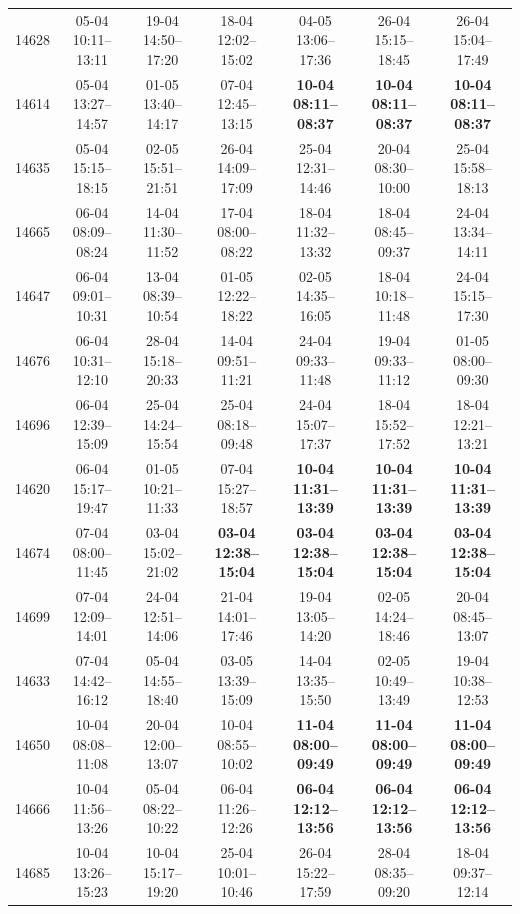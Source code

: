 \begin{table}[htbp]
\begin{tabular}{|r|c|c|c|c|c|c|}
14628 & 05-04 10:11--13:11 & 19-04 14:50--17:20 & 18-04 12:02--15:02 & 04-05 13:06--17:36 & 26-04 15:15--18:45 & 26-04 15:04--17:49 \\ 
14614 & 05-04 13:27--14:57 & 01-05 13:40--14:17 & 07-04 12:45--13:15 & \textbf{10-04 08:11--08:37} & \textbf{10-04 08:11--08:37} & \textbf{10-04 08:11--08:37} \\ 
14635 & 05-04 15:15--18:15 & 02-05 15:51--21:51 & 26-04 14:09--17:09 & 25-04 12:31--14:46 & 20-04 08:30--10:00 & 25-04 15:58--18:13 \\ 
14665 & 06-04 08:09--08:24 & 14-04 11:30--11:52 & 17-04 08:00--08:22 & 18-04 11:32--13:32 & 18-04 08:45--09:37 & 24-04 13:34--14:11 \\ 
14647 & 06-04 09:01--10:31 & 13-04 08:39--10:54 & 01-05 12:22--18:22 & 02-05 14:35--16:05 & 18-04 10:18--11:48 & 24-04 15:15--17:30 \\ 
14676 & 06-04 10:31--12:10 & 28-04 15:18--20:33 & 14-04 09:51--11:21 & 24-04 09:33--11:48 & 19-04 09:33--11:12 & 01-05 08:00--09:30 \\ 
14696 & 06-04 12:39--15:09 & 25-04 14:24--15:54 & 25-04 08:18--09:48 & 24-04 15:07--17:37 & 18-04 15:52--17:52 & 18-04 12:21--13:21 \\ 
14620 & 06-04 15:17--19:47 & 01-05 10:21--11:33 & 07-04 15:27--18:57 & \textbf{10-04 11:31--13:39} & \textbf{10-04 11:31--13:39} & \textbf{10-04 11:31--13:39} \\ 
14674 & 07-04 08:00--11:45 & 03-04 15:02--21:02 & \textbf{03-04 12:38--15:04} & \textbf{03-04 12:38--15:04} & \textbf{03-04 12:38--15:04} & \textbf{03-04 12:38--15:04} \\ 
14699 & 07-04 12:09--14:01 & 24-04 12:51--14:06 & 21-04 14:01--17:46 & 19-04 13:05--14:20 & 02-05 14:24--18:46 & 20-04 08:45--13:07 \\ 
14633 & 07-04 14:42--16:12 & 05-04 14:55--18:40 & 03-05 13:39--15:09 & 14-04 13:35--15:50 & 02-05 10:49--13:49 & 19-04 10:38--12:53 \\ 
14650 & 10-04 08:08--11:08 & 20-04 12:00--13:07 & 10-04 08:55--10:02 & \textbf{11-04 08:00--09:49} & \textbf{11-04 08:00--09:49} & \textbf{11-04 08:00--09:49} \\ 
14666 & 10-04 11:56--13:26 & 05-04 08:22--10:22 & 06-04 11:26--12:26 & \textbf{06-04 12:12--13:56} & \textbf{06-04 12:12--13:56} & \textbf{06-04 12:12--13:56} \\ 
14685 & 10-04 13:26--15:23 & 10-04 15:17--19:20 & 25-04 10:01--10:46 & 26-04 15:22--17:59 & 28-04 08:35--09:20 & 18-04 09:37--12:14 \\ 

\end{tabular}
\end{table}
